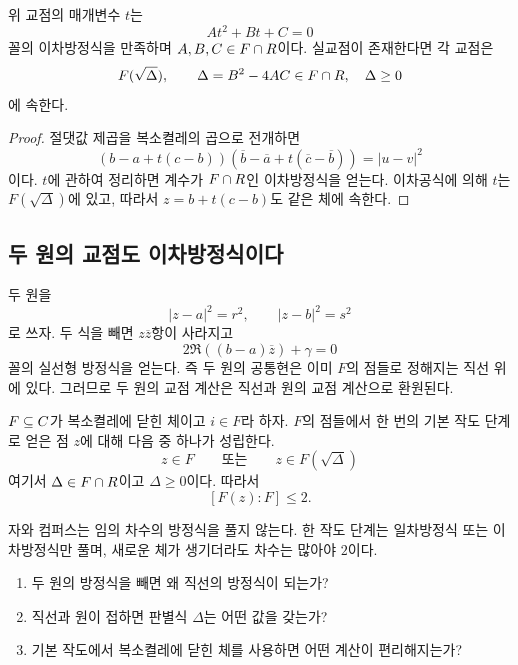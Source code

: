 \begin{proposition}[직선--원 교점]
위 교점의 매개변수 $t$는
\[
  At^2+Bt+C=0
\]
꼴의 이차방정식을 만족하며 $A,B,C\in F\cap R$이다. 실교점이 존재한다면 각 교점은
\[
  F(\sqrt\Delta),
  \qquad
  \Delta=B^2-4AC\in F\cap R,\quad \Delta\ge0
\]
에 속한다.
\end{proposition}

\begin{proof}
절댓값 제곱을 복소켤레의 곱으로 전개하면
\[
  (b-a+t(c-b))(\overline b-\overline a+t(\overline c-\overline b))
  =|u-v|^2
\]
이다. $t$에 관하여 정리하면 계수가 $F\cap R$인 이차방정식을 얻는다. 이차공식에 의해 $t$는 $F(\sqrt\Delta)$에 있고, 따라서 $z=b+t(c-b)$도 같은 체에 속한다.
\end{proof}

\subsection{두 원의 교점도 이차방정식이다}

두 원을
\[
  |z-a|^2=r^2,
  \qquad
  |z-b|^2=s^2
\]
로 쓰자. 두 식을 빼면 $z\overline z$항이 사라지고
\[
  2\Re((b-a)\overline z)+\gamma=0
\]
꼴의 실선형 방정식을 얻는다. 즉 두 원의 공통현은 이미 $F$의 점들로 정해지는 직선 위에 있다. 그러므로 두 원의 교점 계산은 직선과 원의 교점 계산으로 환원된다.

\begin{corollary}
$F\subseteq C$가 복소켤레에 닫힌 체이고 $i\in F$라 하자. $F$의 점들에서 한 번의 기본 작도 단계로 얻은 점 $z$에 대해 다음 중 하나가 성립한다.
\[
  z\in F
  \qquad\text{또는}\qquad
  z\in F(\sqrt\Delta)
\]
여기서 $\Delta\in F\cap R$이고 $\Delta\ge0$이다. 따라서
\[
  [F(z):F]\le2.
\]
\end{corollary}

\begin{keyidea}
자와 컴퍼스는 임의 차수의 방정식을 풀지 않는다. 한 작도 단계는 일차방정식 또는 이차방정식만 풀며, 새로운 체가 생기더라도 차수는 많아야 $2$이다.
\end{keyidea}

\begin{checkpoint}
\begin{enumerate}[label=(\alph*)]
  \item 두 원의 방정식을 빼면 왜 직선의 방정식이 되는가?
  \item 직선과 원이 접하면 판별식 $\Delta$는 어떤 값을 갖는가?
  \item 기본 작도에서 복소켤레에 닫힌 체를 사용하면 어떤 계산이 편리해지는가?
\end{enumerate}
\end{checkpoint}
